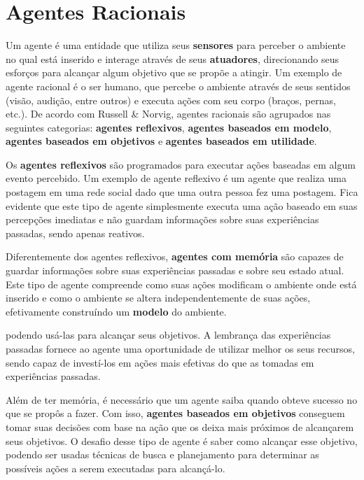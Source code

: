 \section{\label{section:agents}Agentes Racionais}
Um agente é uma entidade que utiliza seus \textbf{sensores} para perceber o
ambiente no qual está inserido e interage através de seus \textbf{atuadores},
direcionando seus esforços para alcançar algum objetivo que se propõe a
atingir\cite[cap. 2]{RussellNorvig200912}. Um exemplo de agente racional é o ser
humano, que percebe o ambiente através de seus sentidos (visão, audição, entre
outros) e executa ações com seu corpo (braços, pernas, etc.). De acordo com
Russell \& Norvig\cite{RussellNorvig200912}, agentes racionais são agrupados nas
seguintes categorias: \textbf{agentes reflexivos}, \textbf{agentes baseados em
modelo}, \textbf{agentes baseados em objetivos} e \textbf{agentes baseados em
utilidade}.

Os \textbf{agentes reflexivos} são programados para executar ações baseadas em
algum evento percebido. Um exemplo de agente reflexivo é um agente que realiza
uma postagem em uma rede social dado que uma outra pessoa fez uma postagem. Fica
evidente que este tipo de agente simplesmente executa uma ação baseado em suas
percepções imediatas e não guardam informações sobre suas experiências passadas,
sendo apenas reativos.

Diferentemente dos agentes reflexivos, \textbf{agentes com memória} são capazes
de guardar informações sobre suas experiências passadas e sobre seu estado
atual. Este tipo de agente compreende como suas ações modificam o ambiente onde
está inserido e como o ambiente se altera independentemente de suas ações,
efetivamente construíndo um \textbf{modelo} do ambiente. 

podendo usá-las para
alcançar seus objetivos. A lembrança das experiências passadas fornece ao agente
uma oportunidade de utilizar melhor os seus recursos, sendo capaz de investí-los
em ações mais efetivas do que as tomadas em experiências passadas.

Além de ter memória, é necessário que um agente saiba quando obteve sucesso no
que se propôs a fazer. Com isso, \textbf{agentes baseados em objetivos}
conseguem tomar suas decisões com base na ação que os deixa mais próximos de
alcançarem seus objetivos. O desafio desse tipo de agente é saber como alcançar
esse objetivo, podendo ser usadas técnicas de busca e planejamento para
determinar as possíveis ações a serem executadas para alcançá-lo.

